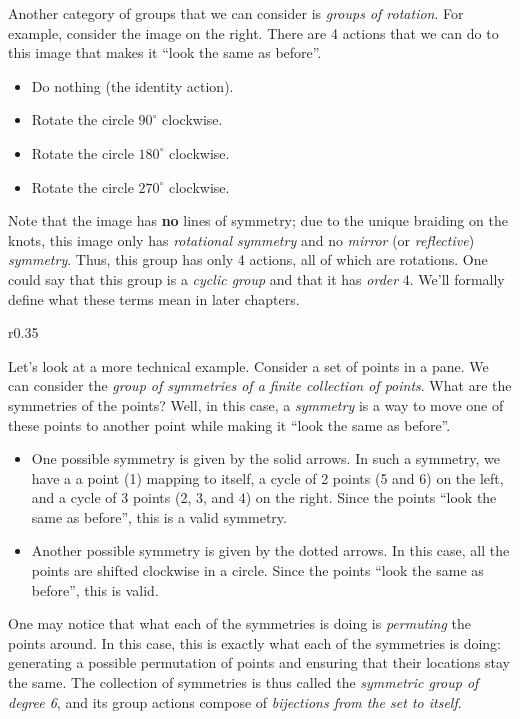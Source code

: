 Another category of groups that we can consider is \textit{groups of rotation}. For example, consider the image on the right. There are 4 actions that we can do to this image that makes it ``look the same as before''.
\begin{itemize}
    \item Do nothing (the identity action).
    \item Rotate the circle $90^\circ$ clockwise.
    \item Rotate the circle $180^\circ$ clockwise.
    \item Rotate the circle $270^\circ$ clockwise.
\end{itemize}
Note that the image has \textbf{no} lines of symmetry; due to the unique braiding on the knots, this image only has \textit{rotational symmetry} and no \textit{mirror} (or \textit{reflective}) \textit{symmetry}. Thus, this group has only 4 actions, all of which are rotations. One could say that this group is a \textit{cyclic group} and that it has \textit{order} 4. We'll formally define what these terms mean in later chapters.

\begin{wrapfigure}{r}{0.35\textwidth}
    \centering
\end{wrapfigure}

Let's look at a more technical example. Consider a set of points in a pane. We can consider the \textit{group of symmetries of a finite collection of points}. What are the symmetries of the points? Well, in this case, a \textit{symmetry} is a way to move one of these points to another point while making it ``look the same as before''.

\begin{itemize}
    \item One possible symmetry is given by the solid arrows. In such a symmetry, we have a a point (1) mapping to itself, a cycle of 2 points (5 and 6) on the left, and a cycle of 3 points (2, 3, and 4) on the right. Since the points ``look the same as before'', this is a valid symmetry.
    \item Another possible symmetry is given by the dotted arrows. In this case, all the points are shifted clockwise in a circle. Since the points ``look the same as before'', this is valid.
\end{itemize}

One may notice that what each of the symmetries is doing is \textit{permuting} the points around. In this case, this is exactly what each of the symmetries is doing: generating a possible permutation of points and ensuring that their locations stay the same. The collection of symmetries is thus called the \textit{symmetric group of degree 6}, and its group actions compose of \textit{bijections from the set to itself}.

